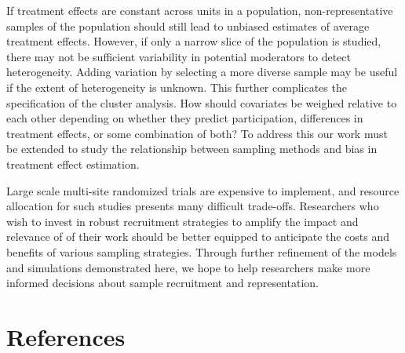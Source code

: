 \documentclass[
  man,floatsintext]{apa6}
\begin{document}
If treatment effects are constant across units in a population, non-representative samples of the population should still lead to unbiased estimates of average treatment effects. However, if only a narrow slice of the population is studied, there may not be sufficient variability in potential moderators to detect heterogeneity. Adding variation by selecting a more diverse sample may be useful if the extent of heterogeneity is unknown. This further complicates the specification of the cluster analysis. How should covariates be weighed relative to each other depending on whether they predict participation, differences in treatment effects, or some combination of both? To address this our work must be extended to study the relationship between sampling methods and bias in treatment effect estimation.

Large scale multi-site randomized trials are expensive to implement, and resource allocation for such studies presents many difficult trade-offs. Researchers who wish to invest in robust recruitment strategies to amplify the impact and relevance of of their work should be better equipped to anticipate the costs and benefits of various sampling strategies. Through further refinement of the models and simulations demonstrated here, we hope to help researchers make more informed decisions about sample recruitment and representation.

\newpage

\hypertarget{references}{%
\section*{References}\label{references}}

\begingroup
\setlength{\parindent}{-0.5in}
\end{document}
